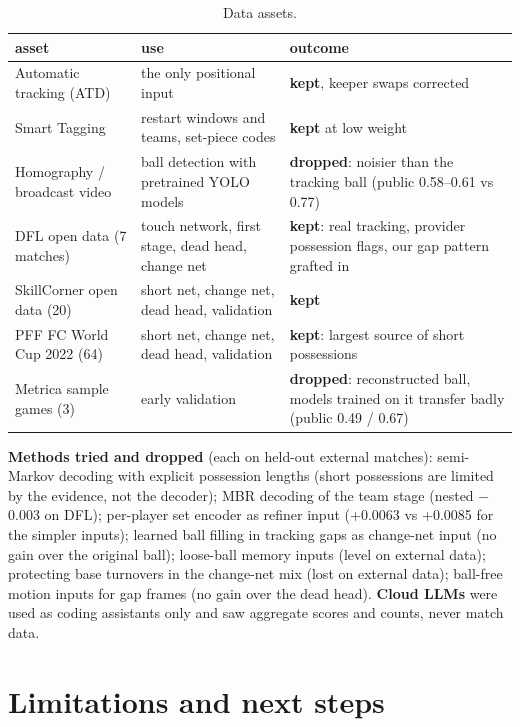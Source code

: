 \documentclass[10pt,a4paper]{article}
\begin{document}
\begin{table}[!htbp]
\centering\small
\begin{tabularx}{\linewidth}{@{}>{\raggedright\arraybackslash}p{3.6cm}>{\raggedright\arraybackslash}X>{\raggedright\arraybackslash}p{4.2cm}@{}}
\toprule
asset & use & outcome \\
\midrule
Automatic tracking (ATD) & the only positional input & \textbf{kept}, keeper swaps corrected \\
Smart Tagging & restart windows and teams, set-piece codes & \textbf{kept} at low weight \\
Homography / broadcast video & ball detection with pretrained YOLO models & \textbf{dropped}: noisier than the tracking ball (public 0.58--0.61 vs 0.77) \\
DFL open data (7 matches) & touch network, first stage, dead head, change net & \textbf{kept}: real tracking, provider possession flags, our gap pattern grafted in \\
SkillCorner open data (20) & short net, change net, dead head, validation & \textbf{kept} \\
PFF FC World Cup 2022 (64) & short net, change net, dead head, validation & \textbf{kept}: largest source of short possessions \\
Metrica sample games (3) & early validation & \textbf{dropped}: reconstructed ball, models trained on it transfer badly (public 0.49 / 0.67) \\
\bottomrule
\end{tabularx}
\caption{Data assets.}
\end{table}

\textbf{Methods tried and dropped} (each on held-out external matches): semi-Markov decoding with
explicit possession lengths (short possessions are limited by the evidence, not the decoder); MBR
decoding of the team stage (nested $-$0.003 on DFL); per-player set encoder as refiner input (+0.0063
vs +0.0085 for the simpler inputs); learned ball filling in tracking gaps as change-net input (no
gain over the original ball); loose-ball memory inputs (level on external data); protecting base
turnovers in the change-net mix (lost on external data); ball-free motion inputs for gap frames (no gain
over the dead head). \textbf{Cloud LLMs} were used as coding assistants only and saw aggregate scores
and counts, never match data.

\section{Limitations and next steps}
\end{document}
